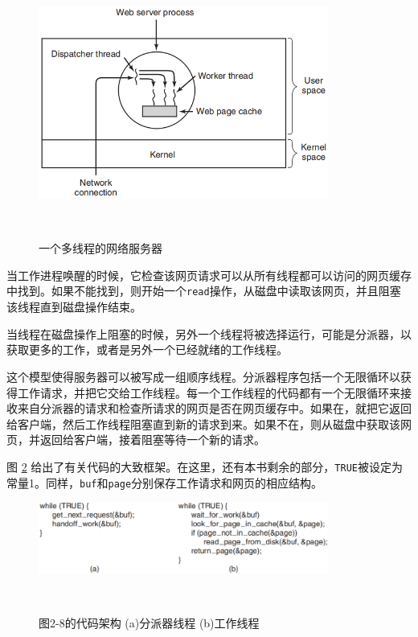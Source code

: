 	\begin{figure}[ht]\small
		\centering
		\includegraphics[width=0.85\textwidth]{FIG/2-8.png}
		\caption{一个多线程的网络服务器}　\label{fig:multithreadswebserver}
	\end{figure}

	当工作进程唤醒的时候，它检查该网页请求可以从所有线程都可以访问的网页缓存中找到。如果不能找到，则开始一个\texttt{read}操作，从磁盘中读取该网页，并且阻塞该线程直到磁盘操作结束。
	
	当线程在磁盘操作上阻塞的时候，另外一个线程将被选择运行，可能是分派器，以获取更多的工作，或者是另外一个已经就绪的工作线程。
	
	这个模型使得服务器可以被写成一组顺序线程。分派器程序包括一个无限循环以获得工作请求，并把它交给工作线程。每一个工作线程的代码都有一个无限循环来接收来自分派器的请求和检查所请求的网页是否在网页缓存中。如果在，就把它返回给客户端，然后工作线程阻塞直到新的请求到来。如果不在，则从磁盘中获取该网页，并返回给客户端，接着阻塞等待一个新的请求。
	
	图 \ref{fig:coderouting} 给出了有关代码的大致框架。在这里，还有本书剩余的部分，\texttt{TRUE}被设定为常量1。同样，\texttt{buf}和\texttt{page}分别保存工作请求和网页的相应结构。
	
	\begin{figure}[ht]\small
		\centering
		\includegraphics[width=0.85\textwidth]{FIG/2-9.png}
		\caption{图2-8的代码架构 (a)分派器线程 (b)工作线程}　\label{fig:coderouting}
	\end{figure}
	
